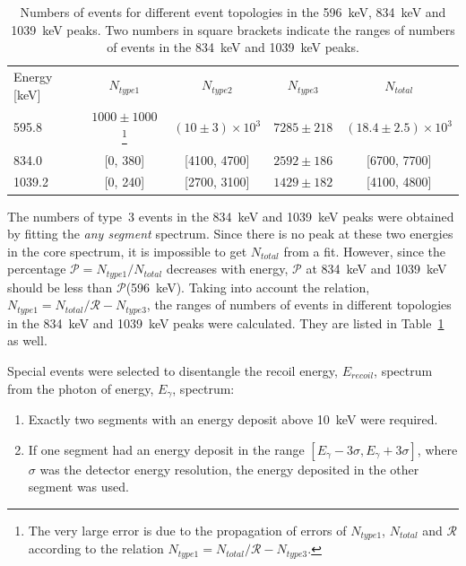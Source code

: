 \begin{table}[tbhp]
\centering
\caption{Numbers of events for different event topologies in the 596~keV, 834~keV and 1039~keV peaks. Two numbers in square brackets indicate the ranges of numbers of events in the 834~keV and 1039~keV peaks.}
\label{tab:neu:ncore}
\begin{minipage}{\textwidth}\centering
\begin{tabular*}{\textwidth}{lcccc} \hline\noalign{\smallskip}
Energy [keV] & $N_{type 1}$ & $N_{type 2}$ & $N_{type 3}$ & $N_{total}$ \\ \noalign{\smallskip}\hline\noalign{\smallskip} 
595.8 & $1000 \pm 1000$ \footnote{The very large error is due to the propagation of errors of $N_{type1}$, $N_{total}$ and $\mathcal{R}$ according to the relation $N_{type1} = N_{total} / \mathcal{R} - N_{type3}$.} & $(10 \pm 3)\times10^3$ & $7285 \pm 218$ & $(18.4 \pm 2.5)\times10^3$ \\
834.0  & [0, 380] & [4100, 4700] & $2592 \pm 186$ & [6700, 7700] \\
1039.2 & [0, 240] & [2700, 3100] & $1429 \pm 182$ & [4100, 4800] \\
\end{tabular*}
\end{minipage}
\end{table}

The numbers of type~3 events in the 834~keV and 1039~keV peaks were obtained by fitting the \emph{any segment} spectrum. Since there is no peak at these two energies in the core spectrum, it is impossible to get $N_{total}$ from a fit. However, since the percentage $\mathcal{P} = N_{type1} / N_{total}$ decreases with energy, $\mathcal{P}$ at 834~keV and 1039~keV should be less than $\mathcal{P}$(596~keV). Taking into account the relation, $N_{type1} = N_{total}/\mathcal{R} - N_{type3}$, the ranges of numbers of events in different topologies in the 834~keV and 1039~keV peaks were calculated. They are listed in Table~\ref{tab:neu:ncore} as well.

Special events were selected to disentangle the recoil energy, $E_{recoil}$, spectrum from the photon of energy, $E_\gamma$, spectrum:
\begin{enumerate}
\item Exactly two segments with an energy deposit above 10~keV were required.
\item If one segment had an energy deposit in the range $[E_\gamma-3\sigma, E_\gamma+3\sigma]$, where $\sigma$ was the detector energy resolution, the energy deposited in the other segment was used.
\end{enumerate}

